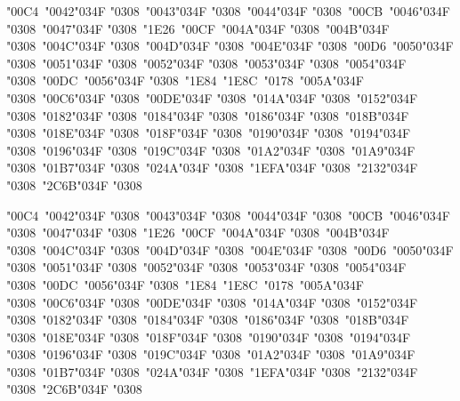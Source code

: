 \documentclass[10pt]{article}
\newcommand{\cgj}{\char"034F }
\begin{document}
\par\noindent{}\parbox[t]{\dimexpr\linewidth-2.4cm}{\PropB\fontsize{18}{30}\selectfont\raggedright {\color{pre}\char"00C4}\ \char"0042\cgj\char"0308\ \char"0043\cgj\char"0308\ \char"0044\cgj\char"0308\ {\color{pre}\char"00CB}\ \char"0046\cgj\char"0308\ \char"0047\cgj\char"0308\ {\color{pre}\char"1E26}\ {\color{pre}\char"00CF}\ \char"004A\cgj\char"0308\ \char"004B\cgj\char"0308\ \char"004C\cgj\char"0308\ \char"004D\cgj\char"0308\ \char"004E\cgj\char"0308\ {\color{pre}\char"00D6}\ \char"0050\cgj\char"0308\ \char"0051\cgj\char"0308\ \char"0052\cgj\char"0308\ \char"0053\cgj\char"0308\ \char"0054\cgj\char"0308\ {\color{pre}\char"00DC}\ \char"0056\cgj\char"0308\ {\color{pre}\char"1E84}\ {\color{pre}\char"1E8C}\ {\color{pre}\char"0178}\ \char"005A\cgj\char"0308\ \char"00C6\cgj\char"0308\ \char"00DE\cgj\char"0308\ \char"014A\cgj\char"0308\ \char"0152\cgj\char"0308\ \char"0182\cgj\char"0308\ \char"0184\cgj\char"0308\ \char"0186\cgj\char"0308\ \char"018B\cgj\char"0308\ \char"018E\cgj\char"0308\ \char"018F\cgj\char"0308\ \char"0190\cgj\char"0308\ \char"0194\cgj\char"0308\ \char"0196\cgj\char"0308\ \char"019C\cgj\char"0308\ \char"01A2\cgj\char"0308\ \char"01A9\cgj\char"0308\ \char"01B7\cgj\char"0308\ \char"024A\cgj\char"0308\ \char"1EFA\cgj\char"0308\ \char"2132\cgj\char"0308\ \char"2C6B\cgj\char"0308}\par
\par\noindent{}\parbox[t]{\dimexpr\linewidth-2.4cm}{\PropBI\fontsize{18}{30}\selectfont\raggedright {\color{pre}\char"00C4}\ \char"0042\cgj\char"0308\ \char"0043\cgj\char"0308\ \char"0044\cgj\char"0308\ {\color{pre}\char"00CB}\ \char"0046\cgj\char"0308\ \char"0047\cgj\char"0308\ {\color{pre}\char"1E26}\ {\color{pre}\char"00CF}\ \char"004A\cgj\char"0308\ \char"004B\cgj\char"0308\ \char"004C\cgj\char"0308\ \char"004D\cgj\char"0308\ \char"004E\cgj\char"0308\ {\color{pre}\char"00D6}\ \char"0050\cgj\char"0308\ \char"0051\cgj\char"0308\ \char"0052\cgj\char"0308\ \char"0053\cgj\char"0308\ \char"0054\cgj\char"0308\ {\color{pre}\char"00DC}\ \char"0056\cgj\char"0308\ {\color{pre}\char"1E84}\ {\color{pre}\char"1E8C}\ {\color{pre}\char"0178}\ \char"005A\cgj\char"0308\ \char"00C6\cgj\char"0308\ \char"00DE\cgj\char"0308\ \char"014A\cgj\char"0308\ \char"0152\cgj\char"0308\ \char"0182\cgj\char"0308\ \char"0184\cgj\char"0308\ \char"0186\cgj\char"0308\ \char"018B\cgj\char"0308\ \char"018E\cgj\char"0308\ \char"018F\cgj\char"0308\ \char"0190\cgj\char"0308\ \char"0194\cgj\char"0308\ \char"0196\cgj\char"0308\ \char"019C\cgj\char"0308\ \char"01A2\cgj\char"0308\ \char"01A9\cgj\char"0308\ \char"01B7\cgj\char"0308\ \char"024A\cgj\char"0308\ \char"1EFA\cgj\char"0308\ \char"2132\cgj\char"0308\ \char"2C6B\cgj\char"0308}\par
\end{document}
